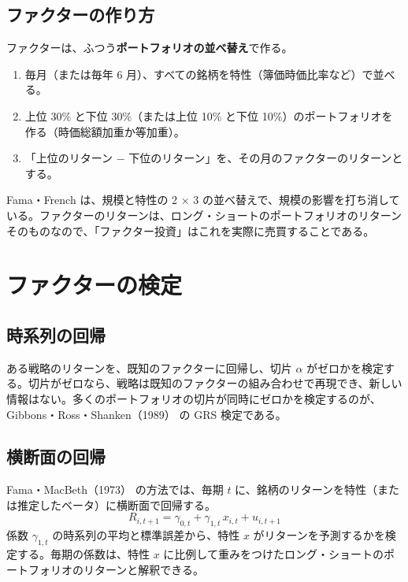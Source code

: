 \subsection{ファクターの作り方}

ファクターは、ふつう\textbf{ポートフォリオの並べ替え}で作る。

\begin{enumerate}
\item 毎月（または毎年 6 月）、すべての銘柄を特性（簿価時価比率など）で並べる。
\item 上位 30\% と下位 30\%（または上位 10\% と下位 10\%）のポートフォリオを作る（時価総額加重か等加重）。
\item 「上位のリターン − 下位のリターン」を、その月のファクターのリターンとする。
\end{enumerate}

Fama・French は、規模と特性の 2 × 3 の並べ替えで、規模の影響を打ち消している。ファクターのリターンは、ロング・ショートのポートフォリオのリターンそのものなので、「ファクター投資」はこれを実際に売買することである。

\section{ファクターの検定}

\subsection{時系列の回帰}

ある戦略のリターンを、既知のファクターに回帰し、切片 $\alpha$ がゼロかを検定する。切片がゼロなら、戦略は既知のファクターの組み合わせで再現でき、新しい情報はない。多くのポートフォリオの切片が同時にゼロかを検定するのが、Gibbons・Ross・Shanken（1989）\cite{grs1989} の GRS 検定である。

\subsection{横断面の回帰}

Fama・MacBeth（1973）\cite{famamacbeth1973} の方法では、毎期 $t$ に、銘柄のリターンを特性（または推定したベータ）に横断面で回帰する。
\begin{equation}
R_{i,t+1} = \gamma_{0,t} + \gamma_{1,t}\,x_{i,t} + u_{i,t+1}
\end{equation}
係数 $\gamma_{1,t}$ の時系列の平均と標準誤差から、特性 $x$ がリターンを予測するかを検定する。毎期の係数は、特性 $x$ に比例して重みをつけたロング・ショートのポートフォリオのリターンと解釈できる。

